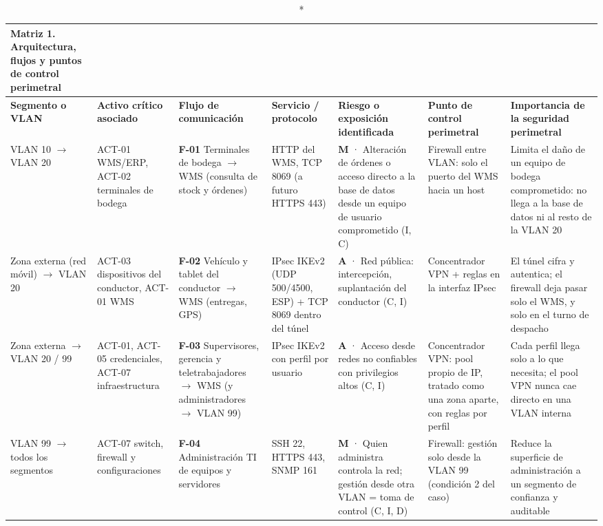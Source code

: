 \documentclass[11pt,a4paper]{article}
\newcommand{\ra}{\ensuremath{\rightarrow}}
\begin{document}
\begin{landscape}
{\footnotesize
\setlength{\tabcolsep}{3pt}
\renewcommand{\arraystretch}{1.05}
\begin{longtable}{@{}P{2.4cm}P{2.8cm}P{3.4cm}P{2.9cm}P{3.6cm}P{3.6cm}P{4.2cm}@{}}
\caption*{\normalsize\textbf{Matriz 1.} Arquitectura, flujos y puntos de control perimetral}\\
\toprule
\textbf{Segmento o VLAN} & \textbf{Activo crítico asociado} & \textbf{Flujo de comunicación} & \textbf{Servicio / protocolo} & \textbf{Riesgo o exposición identificada} & \textbf{Punto de control perimetral} & \textbf{Importancia de la seguridad perimetral} \\ \midrule
\endhead
VLAN 10 \ra{} VLAN 20 & ACT-01 WMS/ERP, ACT-02 terminales de bodega & \textbf{F-01} Terminales de bodega \ra{} WMS (consulta de stock y órdenes) & HTTP del WMS, TCP 8069 (a futuro HTTPS 443) & \textbf{M} · Alteración de órdenes o acceso directo a la base de datos desde un equipo de usuario comprometido (I, C) & Firewall entre VLAN: solo el puerto del WMS hacia un host & Limita el daño de un equipo de bodega comprometido: no llega a la base de datos ni al resto de la VLAN 20 \\ \midrule
Zona externa (red móvil) \ra{} VLAN 20 & ACT-03 dispositivos del conductor, ACT-01 WMS & \textbf{F-02} Vehículo y tablet del conductor \ra{} WMS (entregas, GPS) & IPsec IKEv2 (UDP 500/4500, ESP) + TCP 8069 dentro del túnel & \textbf{A} · Red pública: intercepción, suplantación del conductor (C, I) & Concentrador VPN + reglas en la interfaz IPsec & El túnel cifra y autentica; el firewall deja pasar solo el WMS, y solo en el turno de despacho \\ \midrule
Zona externa \ra{} VLAN 20 / 99 & ACT-01, ACT-05 credenciales, ACT-07 infraestructura & \textbf{F-03} Supervisores, gerencia y teletrabajadores \ra{} WMS (y administradores \ra{} VLAN 99) & IPsec IKEv2 con perfil por usuario & \textbf{A} · Acceso desde redes no confiables con privilegios altos (C, I) & Concentrador VPN: pool propio de IP, tratado como una zona aparte, con reglas por perfil & Cada perfil llega solo a lo que necesita; el pool VPN nunca cae directo en una VLAN interna \\ \midrule
VLAN 99 \ra{} todos los segmentos & ACT-07 switch, firewall y configuraciones & \textbf{F-04} Administración TI de equipos y servidores & SSH 22, HTTPS 443, SNMP 161 & \textbf{M} · Quien administra controla la red; gestión desde otra VLAN = toma de control (C, I, D) & Firewall: gestión solo desde la VLAN 99 (condición 2 del caso) & Reduce la superficie de administración a un segmento de confianza y auditable \\ \midrule

\end{longtable}}
\end{landscape}
\end{document}
